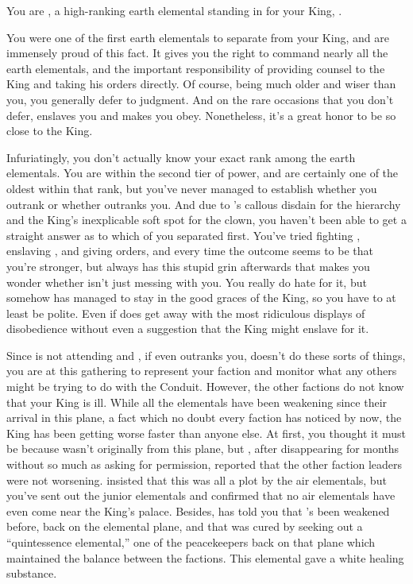 \documentclass[char]{elementals}
\begin{document}
\name{\cLoyal{}}

You are \cLoyal{\intro}, a high-ranking earth elemental standing in for your King, \cEarthKing{}.

You were one of the first earth elementals to separate from your King, and are immensely proud of this fact.  It gives you the right to command nearly all the earth elementals, and the important responsibility of providing counsel to the King and taking his orders directly.  Of course, \cEarthKing{\they} being much older and wiser than you, you generally defer to \cEarthKing{\their} judgment.  And on the rare occasions that you don't defer, \cEarthKing{\they} enslaves you and makes you obey.  Nonetheless, it's a great honor to be so close to the King.

Infuriatingly, you don't actually know your exact rank among the earth elementals.  You are within the second tier of power, and are certainly one of the oldest within that rank, but you've never managed to establish whether you outrank \cRogue{\intro} or whether \cRogue{\they} outranks you.  And due to \cRogue{}'s callous disdain for the hierarchy and the King's inexplicable soft spot for the clown, you haven't been able to get a straight answer as to which of you separated first.  You've tried fighting \cRogue{}, enslaving \cRogue{\them}, and giving \cRogue{\them} orders, and every time the outcome seems to be that you're stronger, but \cRogue{\they} always has this stupid grin afterwards that makes you wonder whether \cRogue{\they} isn't just messing with you.  You really do hate \cRogue{\them} for it, but somehow \cRogue{\they} has managed to stay in the good graces of the King, so you have to at least be polite.  Even if \cRogue{\they} does get away with the most ridiculous displays of disobedience without even a suggestion that the King might enslave \cRogue{\them} for it.

Since \cEarthKing{} is not attending and \cRogue{}, if \cRogue{\they} even outranks you, doesn't do these sorts of things, you are at this gathering to represent your faction and monitor what any others might be trying to do with the Conduit.  However, the other factions do not know that your King is ill.  While all the elementals have been weakening since their arrival in this plane, a fact which no doubt every faction has noticed by now, the King has been getting worse faster than anyone else.  At first, you thought it must be because \cEarthKing{} wasn't originally from this plane, but \cRogue{}, after disappearing for months without so much as asking for permission, reported that the other faction leaders were not worsening.  \cRogue{\They} insisted that this was all a plot by the air elementals, but you've sent out the junior elementals and confirmed that no air elementals have even come near the King's palace.  Besides, \cEarthKing{} has told you that \cEarthKing{\they}'s been weakened before, back on the elemental plane, and that \cEarthKing{\they} was cured by seeking out a ``quintessence elemental,'' one of the peacekeepers back on that plane which maintained the balance between the factions.  This elemental gave \cEarthKing{\them} a white healing substance.  
\end{document}
